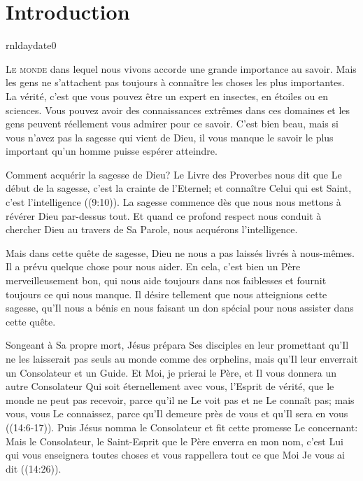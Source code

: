 
\chapter{Introduction}

\expandafter\xdef\csname jrnldaydate0

\lettrine{L}{e monde} dans lequel nous vivons accorde une grande
 importance au savoir. Mais les gens ne s'attachent pas toujours
 à connaître les choses les plus importantes.
 La vérité, c'est que vous pouvez être un expert en insectes,
 en étoiles ou en sciences. Vous pouvez avoir des connaissances extrêmes
 dans ces domaines et les gens peuvent réellement vous admirer pour ce savoir.
 C'est bien beau, mais si vous n'avez pas la sagesse qui vient de Dieu,
 il vous manque le savoir le plus important qu'un homme puisse espérer atteindre.

Comment acquérir la sagesse de Dieu? Le Livre des Proverbes nous dit que
 \Og Le début de la sagesse, c'est la crainte de l'Eternel;
 et connaître Celui qui est Saint, c'est l'intelligence \Fg{}
 ((9:10)).
 La sagesse commence dès que nous nous mettons à révérer Dieu par-dessus tout.
 Et quand ce profond respect nous conduit
 à chercher Dieu au travers de Sa Parole, nous acquérons l'intelligence.

Mais dans cette quête de sagesse, Dieu ne nous a pas laissés livrés à nous-mêmes.
 Il a prévu quelque chose pour nous aider. En cela, c'est bien un Père
 merveilleusement bon, qui nous aide toujours dans nos faiblesses et fournit
 toujours ce qui nous manque. Il désire tellement que nous atteignions cette
 sagesse, qu'Il nous a bénis en nous faisant un don spécial pour nous assister
 dans cette quête.

Songeant à Sa propre mort, Jésus prépara Ses disciples en leur promettant
 qu'Il ne les laisserait pas seuls au monde comme des orphelins,
 mais qu'Il leur enverrait un Consolateur et un Guide.
 \Og Et Moi, je prierai le Père, et Il vous donnera un autre Consolateur
 Qui soit éternellement avec vous, l'Esprit de vérité, que le monde
 ne peut pas recevoir, parce qu'il ne Le voit pas et ne Le connaît pas;
 mais vous, vous Le connaissez, parce qu'Il demeure près de vous
 et qu'Il sera en vous \Fg{} ((14:6-17)).
 Puis Jésus nomma le Consolateur et fit cette promesse Le concernant:
 \Og Mais le Consolateur, le Saint-Esprit que le Père enverra en mon nom,
 c'est Lui qui vous enseignera toutes choses et vous rappellera tout ce que
 Moi Je vous ai dit \Fg{} ((14:26)).

